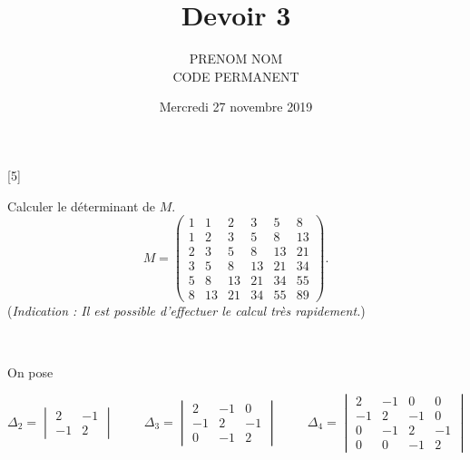\documentclass[letter,12pt]{exam}
\title{{\Large{\textbf{Devoir 3}}}}
\date{Mercredi 27 novembre 2019}
\author{PRENOM NOM \\ CODE PERMANENT}
\begin{document}
\maketitle 
\thispagestyle{headandfoot}

\hrulefill

\pointsinrightmargin
\printanswers

\begin{questions}
	
	\vspace*{.5cm}
	 ~

	Calculer le déterminant de $M$. $$M = \left(\begin{array}{rrrrrr}
	1 & 1 & 2 & 3 & 5 & 8 \\
	1 & 2 & 3 & 5 & 8 & 13 \\
	2 & 3 & 5 & 8 & 13 & 21 \\
	3 & 5 & 8 & 13 & 21 & 34 \\
	5 & 8 & 13 & 21 & 34 & 55 \\
	8 & 13 & 21 & 34 & 55 & 89
	\end{array}\right)
	.$$
	(\textit{Indication : Il est possible d'effectuer le calcul très rapidement.})
	
	\begin{solutionorbox}
	\end{solutionorbox}
	
	\vspace*{.5cm}
	 ~
	
	On pose 
	
	$$\Delta_2 = \begin{vmatrix}
	2 & -1 \\ -1 & 2
	\end{vmatrix} \hspace{1cm}
	\Delta_3 = \begin{vmatrix}
	2 & -1 & 0 \\ -1 & 2 & -1 \\ 0 & -1 & 2
	\end{vmatrix} \hspace{1cm}
	\Delta_4 = \begin{vmatrix}
	2 & -1 & 0 & 0 \\ -1 & 2 & -1 & 0 \\ 0 & -1 & 2 & -1 \\ 0 & 0 & -1 & 2
	\end{vmatrix}$$
	

\end{questions}
\end{document}
